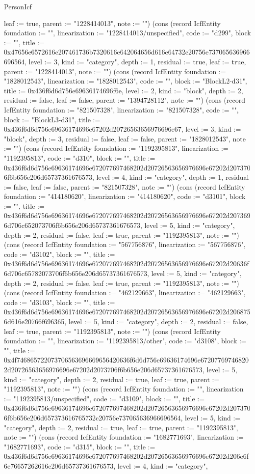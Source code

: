 \begin{lexlean}{PersonIcf}
\begin{semanticmodule}
{leaf := true, parent := "1228414013", note := ""}) (cons (record IcfEntity {foundation := "", linearization := "1228414013/unspecified", code := "d299", block := "", title := 0x47656e6572616c207461736b7320616e642064656d616e64732c20756e737065636966696564, level := 3, kind := "category", depth := 1, residual := true, leaf := true, parent := "1228414013", note := ""}) (cons (record IcfEntity {foundation := "1828012543", linearization := "1828012543", code := "", block := "BlockL2-d31", title := 0x436f6d6d756e69636174696f6e, level := 2, kind := "block", depth := 2, residual := false, leaf := false, parent := "1394728112", note := ""}) (cons (record IcfEntity {foundation := "821507328", linearization := "821507328", code := "", block := "BlockL3-d31", title := 0x436f6d6d756e69636174696e67202d20726563656976696e67, level := 3, kind := "block", depth := 3, residual := false, leaf := false, parent := "1828012543", note := ""}) (cons (record IcfEntity {foundation := "1192395813", linearization := "1192395813", code := "d310", block := "", title := 0x436f6d6d756e69636174696e672077697468202d20726563656976696e67202d2073706f6b656e206d65737361676573, level := 4, kind := "category", depth := 1, residual := false, leaf := false, parent := "821507328", note := ""}) (cons (record IcfEntity {foundation := "414180620", linearization := "414180620", code := "d3101", block := "", title := 0x436f6d6d756e69636174696e672077697468202d20726563656976696e67202d2073696d706c652073706f6b656e206d65737361676573, level := 5, kind := "category", depth := 2, residual := false, leaf := true, parent := "1192395813", note := ""}) (cons (record IcfEntity {foundation := "567756876", linearization := "567756876", code := "d3102", block := "", title := 0x436f6d6d756e69636174696e672077697468202d20726563656976696e67202d20636f6d706c65782073706f6b656e206d65737361676573, level := 5, kind := "category", depth := 2, residual := false, leaf := true, parent := "1192395813", note := ""}) (cons (record IcfEntity {foundation := "462129663", linearization := "462129663", code := "d3103", block := "", title := 0x436f6d6d756e69636174696e672077697468202d20726563656976696e67202d2068756d616e20766f696365, level := 5, kind := "category", depth := 2, residual := false, leaf := true, parent := "1192395813", note := ""}) (cons (record IcfEntity {foundation := "", linearization := "1192395813/other", code := "d3108", block := "", title := 0x4f746865722073706563696669656420636f6d6d756e69636174696e672077697468202d20726563656976696e67202d2073706f6b656e206d65737361676573, level := 5, kind := "category", depth := 2, residual := true, leaf := true, parent := "1192395813", note := ""}) (cons (record IcfEntity {foundation := "", linearization := "1192395813/unspecified", code := "d3109", block := "", title := 0x436f6d6d756e69636174696e672077697468202d20726563656976696e67202d2073706f6b656e206d657373616765732c20756e737065636966696564, level := 5, kind := "category", depth := 2, residual := true, leaf := true, parent := "1192395813", note := ""}) (cons (record IcfEntity {foundation := "1682771693", linearization := "1682771693", code := "d315", block := "", title := 0x436f6d6d756e69636174696e672077697468202d20726563656976696e67202d206e6f6e76657262616c206d65737361676573, level := 4, kind := "category", }
\end{semanticmodule}
\end{lexlean}

